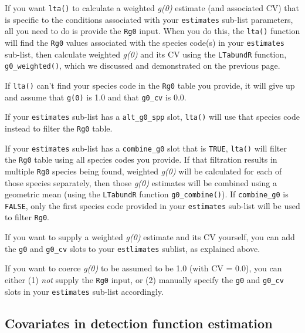 \documentclass[
]{book}
\begin{document}
If you want \texttt{lta()} to calculate a weighted \emph{g(0)} estimate (and associated CV) that is specific to the conditions associated with your \texttt{estimates} sub-list parameters, all you need to do is provide the \texttt{Rg0} input. When you do this, the \texttt{lta()} function will find the \texttt{Rg0} values associated with the species code(s) in your \texttt{estimates} sub-list, then calculate weighted \emph{g(0)} and its CV using the \texttt{LTabundR} function, \texttt{g0\_weighted()}, which we discussed and demonstrated on the previous page.

If \texttt{lta()} can't find your species code in the \texttt{Rg0} table you provide, it will give up and assume that \texttt{g(0)} is 1.0 and that \texttt{g0\_cv} is 0.0.

If your \texttt{estimates} sub-list has a \texttt{alt\_g0\_spp} slot, \texttt{lta()} will use that species code instead to filter the \texttt{Rg0} table.

If your \texttt{estimates} sub-list has a \texttt{combine\_g0} slot that is \texttt{TRUE}, \texttt{lta()} will filter the \texttt{Rg0} table using all species codes you provide. If that filtration results in multiple \texttt{Rg0} species being found, weighted \emph{g(0)} will be calculated for each of those species separately, then those \emph{g(0)} estimates will be combined using a geometric mean (using the \texttt{LTabundR} function \texttt{g0\_combine()}). If \texttt{combine\_g0} is \texttt{FALSE}, only the first species code provided in your \texttt{estimates} sub-list will be used to filter \texttt{Rg0}.

If you want to supply a weighted \emph{g(0)} estimate and its CV yourself, you can add the \texttt{g0} and \texttt{g0\_cv} slots to your \texttt{estlimates} sublist, as explained above.

If you want to coerce \emph{g(0)} to be assumed to be 1.0 (with CV = 0.0), you can either (1) \emph{not} supply the \texttt{Rg0} input, or (2) manually specify the \texttt{g0} and \texttt{g0\_cv} slots in your \texttt{estimates} sub-list accordingly.

\hypertarget{covariates-in-detection-function-estimation}{%
\subsection*{Covariates in detection function estimation}\label{covariates-in-detection-function-estimation}}
\end{document}
